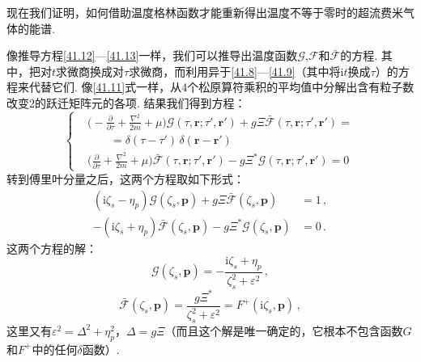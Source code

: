 现在我们证明，如何借助温度格林函数才能重新得出温度不等于零时的超流费米气体的能谱.

像推导方程\eqref{41.12}—\eqref{41.13}一样，我们可以推导出温度函数$\mathcal G$,$\mathcal F$和$\bar{\mathcal F}$的方程. 其中，把对$t$求微商换成对$\tau$求微商，而利用异于\eqref{41.8}—\eqref{41.9}（其中将$\mathrm it$换成$\tau$）的方程来代替它们. 像\eqref{41.11}式一样，从4个松原算符乘积的平均值中分解出含有粒子数改变2的跃迁矩阵元的各项. 结果我们得到方程：
\begin{equation}
\left\{
\begin{aligned}
&\Biggl(-\frac{\partial}{\partial\tau}+\frac{\nabla^2}{2m}+\mu\Biggr)\mathcal G(\tau,\bm r;\tau',\bm r')
+ g\Xi\bar{\mathcal F}(\tau,\bm r;\tau',\bm r') = {}\\
&\qquad = \delta(\tau-\tau')\,\delta(\bm r-\bm r')\\
&\Biggl(\frac{\partial}{\partial\tau}+\frac{\nabla^2}{2m}+\mu\Biggr)\bar{\mathcal F}(\tau,\bm r;\tau',\bm r')
- g\Xi^{*}\mathcal G(\tau,\bm r;\tau',\bm r') = 0
\end{aligned}
\right.
\label{42.5}
\end{equation}
转到傅里叶分量之后，这两个方程取如下形式：
\begin{equation}
\begin{aligned}
(\mathrm i\zeta_s-\eta_p)\mathcal G(\zeta_s,\bm p) + g\Xi\bar{\mathcal F}(\zeta_s,\bm p) &= 1\,,\\
-(\mathrm i\zeta_s+\eta_p)\bar{\mathcal F}(\zeta_s,\bm p) - g\Xi^{*}\mathcal G(\zeta_s,\bm p) &= 0\,.
\end{aligned}
\label{42.6}
\end{equation}
这两个方程的解：
\begin{equation}
\mathcal G(\zeta_s,\bm p) = -\frac{\mathrm i\zeta_s+\eta_p}{\zeta_s^2+\varepsilon^2}\,,
\label{42.7}
\end{equation}
\begin{equation}
\bar{\mathcal F}(\zeta_s,\bm p) = \frac{g\Xi^{*}}{\zeta_s^2+\varepsilon^2} = F^{+}(\mathrm i\zeta_s,\bm p)\,,
\label{42.8}
\end{equation}
这里又有$\varepsilon^2=\Delta^2+\eta_p^2$，$\Delta=g\Xi$（而且这个解是唯一确定的，它根本不包含函数$G$和$F^{+}$中的任何$\delta$函数）.

